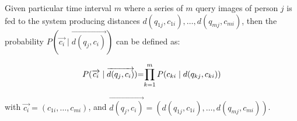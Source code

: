 \documentclass[10pt,a4paper,final]{article}
\begin{document}
Given particular time interval $m$ where a series of $m$ query images of person $j$ is fed to the system producing distances $d(q_{1j}, c_{1i}), \ldots, d(q_{mj}, c_{mi})$, then the probability $P(\overrightarrow{c_i} \mid \overrightarrow{d(q_j, c_i)})$ can be defined as:

\begin{equation}
	\label{eq:joint_third_idea}
	\begin{tabular}{r@{=}l}
		$P(\overrightarrow{c_i} \mid \overrightarrow{d(q_j, c_i)})$ & $\displaystyle \prod_{k=1}^{m} P(c_{ki} \mid d(q_{kj}, c_{ki}))$ \\ 
	\end{tabular}
\end{equation}

\noindent with $\overrightarrow{c_i} = (c_{1i}, \ldots, c_{mi})$, and $\overrightarrow{d(q_j, c_i)} = (d(q_{1j}, c_{1i}), \ldots, d(q_{mj}, c_{mi}))$.
\end{document}
